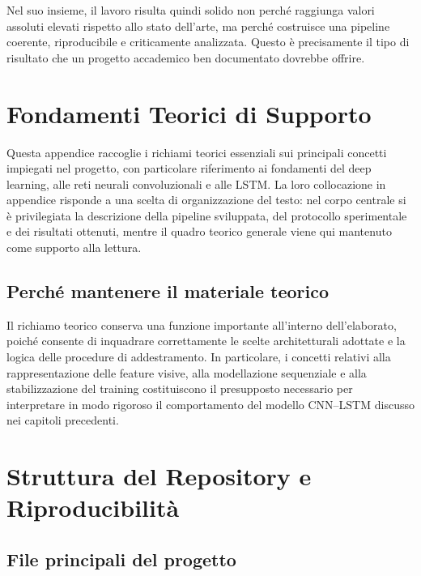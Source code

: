 \documentclass[11pt,a4paper]{report}
\begin{document}
Nel suo insieme, il lavoro risulta quindi solido non perché raggiunga valori assoluti elevati rispetto allo stato dell'arte, ma perché costruisce una pipeline coerente, riproducibile e criticamente analizzata. Questo è precisamente il tipo di risultato che un progetto accademico ben documentato dovrebbe offrire.

\appendix

\chapter{Fondamenti Teorici di Supporto}

Questa appendice raccoglie i richiami teorici essenziali sui principali concetti impiegati nel progetto, con particolare riferimento ai fondamenti del deep learning, alle reti neurali convoluzionali e alle LSTM. La loro collocazione in appendice risponde a una scelta di organizzazione del testo: nel corpo centrale si è privilegiata la descrizione della pipeline sviluppata, del protocollo sperimentale e dei risultati ottenuti, mentre il quadro teorico generale viene qui mantenuto come supporto alla lettura.

\section{Perché mantenere il materiale teorico}

Il richiamo teorico conserva una funzione importante all'interno dell'elaborato, poiché consente di inquadrare correttamente le scelte architetturali adottate e la logica delle procedure di addestramento. In particolare, i concetti relativi alla rappresentazione delle feature visive, alla modellazione sequenziale e alla stabilizzazione del training costituiscono il presupposto necessario per interpretare in modo rigoroso il comportamento del modello CNN--LSTM discusso nei capitoli precedenti.

\chapter{Struttura del Repository e Riproducibilità}

\section{File principali del progetto}
\end{document}
